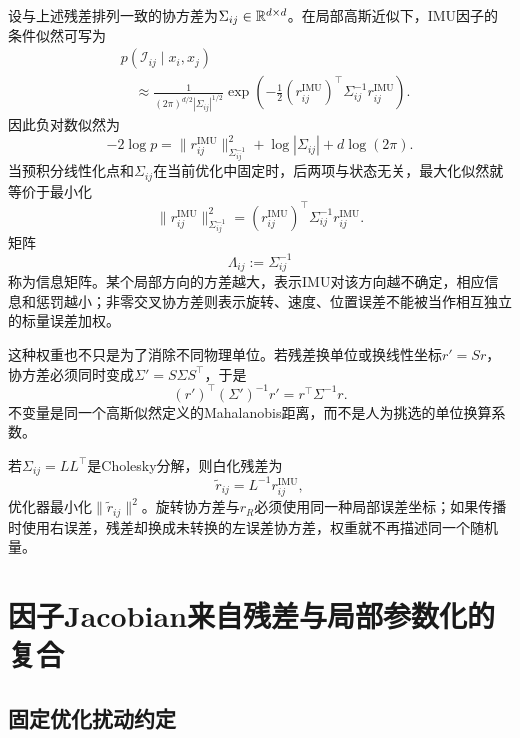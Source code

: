 设与上述残差排列一致的协方差为$\Sigma_{ij}\in\mathbb{R}^{d\times d}$。在局部高斯近似下，IMU因子的条件似然可写为
\[
\boxed{
\begin{aligned}
    &p(\mathcal I_{ij}\mid x_i,x_j)\\
    &\quad\approx
    \frac{1}{(2\pi)^{d/2}|\Sigma_{ij}|^{1/2}}
    \exp\left(
      -\frac12
      (r_{ij}^{\mathrm{IMU}})^\top
      \Sigma_{ij}^{-1}r_{ij}^{\mathrm{IMU}}
    \right).
\end{aligned}
}
\]
因此负对数似然为
\[
    -2\log p
    =\|r_{ij}^{\mathrm{IMU}}\|_{\Sigma_{ij}^{-1}}^2
      +\log|\Sigma_{ij}|+d\log(2\pi).
\]
当预积分线性化点和$\Sigma_{ij}$在当前优化中固定时，后两项与状态无关，最大化似然就等价于最小化
\[
    \|r_{ij}^{\mathrm{IMU}}\|_{\Sigma_{ij}^{-1}}^2
    =(r_{ij}^{\mathrm{IMU}})^\top
      \Sigma_{ij}^{-1}r_{ij}^{\mathrm{IMU}}.
\]
矩阵
\[
    \Lambda_{ij}:=\Sigma_{ij}^{-1}
\]
称为信息矩阵。某个局部方向的方差越大，表示IMU对该方向越不确定，相应信息和惩罚越小；非零交叉协方差则表示旋转、速度、位置误差不能被当作相互独立的标量误差加权。

这种权重也不只是为了消除不同物理单位。若残差换单位或换线性坐标$r'=Sr$，协方差必须同时变成$\Sigma'=S\Sigma S^\top$，于是
\[
    (r')^\top(\Sigma')^{-1}r'
    =r^\top\Sigma^{-1}r.
\]
不变量是同一个高斯似然定义的Mahalanobis距离，而不是人为挑选的单位换算系数。

若$\Sigma_{ij}=LL^\top$是Cholesky分解，则白化残差为
\[
    \widetilde r_{ij}=L^{-1}r_{ij}^{\mathrm{IMU}},
\]
优化器最小化$\|\widetilde r_{ij}\|^2$。旋转协方差与$r_R$必须使用同一种局部误差坐标；如果传播时使用右误差，残差却换成未转换的左误差协方差，权重就不再描述同一个随机量。


\section{因子Jacobian来自残差与局部参数化的复合}

\subsection{固定优化扰动约定}

